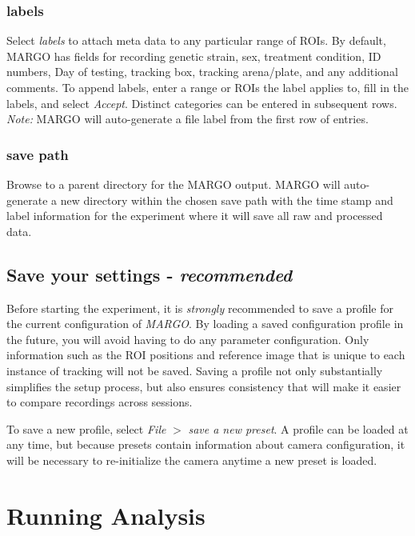 \documentclass[11pt]{article}
\begin{document}
\subsubsection{labels}

Select \textit{labels} to attach meta data to any particular range of ROIs. By default, MARGO has fields for recording genetic strain, sex, treatment condition, ID numbers, Day of testing, tracking box, tracking arena/plate, and any additional comments. To append labels, enter a range or ROIs the label applies to, fill in the labels, and select \textit{Accept}. Distinct categories can be entered in subsequent rows. \textit{Note:} MARGO will auto-generate a file label from the first row of entries.
 
\subsubsection{save path}

Browse to a parent directory for the MARGO output. MARGO will auto-generate a new directory within the chosen save path with the time stamp and label information for the experiment where it will save all raw and processed data. 

\hypertarget{saveprofile}{\subsection{Save your settings - \textit{recommended}}}

Before starting the experiment, it is \textit{strongly} recommended to save a profile for the current configuration of \textit{MARGO}. By loading a saved configuration profile in the future, you will avoid having to do any parameter configuration. Only information such as the ROI positions and reference image that is unique to each instance of tracking will not be saved. Saving a profile not only substantially simplifies the setup process, but also ensures consistency that will make it easier to compare recordings across sessions.

To save a new profile, select \textit{File} $>$ \textit{save a new preset}. A profile can be loaded at any time, but because presets contain information about camera configuration, it will be necessary to re-initialize the camera anytime a new preset is loaded.

\newpage
\section{Running Analysis}
\end{document}
